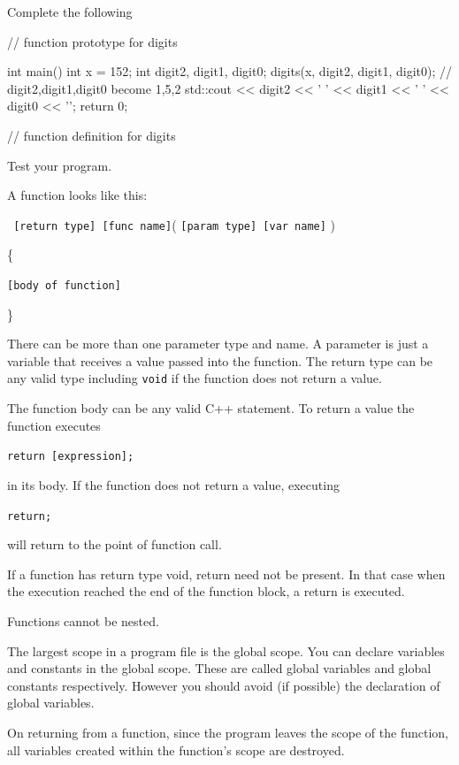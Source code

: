 \begin{ex}
Complete the following

\begin{consolethree}[escapeinside=||]
// function prototype for digits

int main()
{
    int x = 152;
    int digit2, digit1, digit0;
    digits(x, digit2, digit1, digit0);
    // digit2,digit1,digit0 become 1,5,2
    std::cout << digit2 << ' ' << digit1 << ' '
              << digit0 << '\n';
    return 0;
}

// function definition for digits
\end{consolethree}

Test your program.
\end{ex}


\newpage{}

A function looks like this:

\texttt{ [return type] [func name]}( \texttt{[param type] [var name]} )

\{

\texttt{[body of function]}

\}

There can be more than one parameter type and name. A parameter is just a variable that receives a value passed into the function. The return type can be any valid type including \texttt{void} if the function does not return a value.

The function body can be any valid C++ statement. To return a value the
function executes

\texttt{return [expression];}

in its body. If the function does not return a value, executing
\begin{center}
\texttt{return;}
\end{center}
will return to the point of function call.

If a function has return type void, return need not be present. In that case when the execution reached the end of the function block, a return is executed.

Functions cannot be nested.

The largest scope in a program file is the global scope. You can declare variables and constants in the global scope. These are called global variables and global constants respectively. However you should avoid (if possible) the declaration of global variables.

On returning from a function, since the program leaves the scope of the function, all variables created within the function's scope are destroyed.

